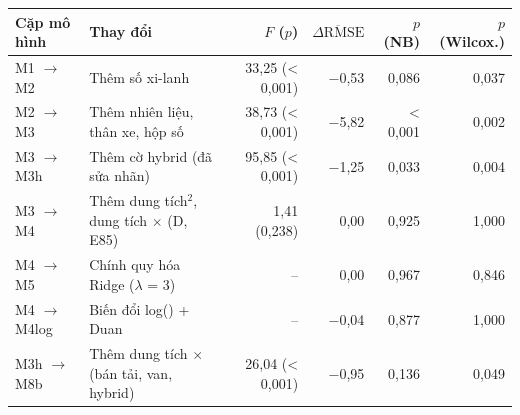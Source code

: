 \begin{tabular}{@{}l >{\raggedright\arraybackslash}p{4.3cm} r r r r@{}}
\toprule
Cặp mô hình & Thay đổi & $F$ ($p$) & $\overline{\Delta\text{RMSE}}$ & $p$ (NB) & $p$ (Wilcox.) \\
\midrule
M1 $\to$ M2 & Thêm số xi-lanh & 33,25 (< 0,001) & −0,53 & 0,086 & 0,037 \\
M2 $\to$ M3 & Thêm nhiên liệu, thân xe, hộp số & 38,73 (< 0,001) & −5,82 & < 0,001 & 0,002 \\
M3 $\to$ M3h & Thêm cờ hybrid (đã sửa nhãn) & 95,85 (< 0,001) & −1,25 & 0,033 & 0,004 \\
M3 $\to$ M4 & Thêm dung tích$^2$, dung tích $\times$ (D, E85) & 1,41 (0,238) & 0,00 & 0,925 & 1,000 \\
M4 $\to$ M5 & Chính quy hóa Ridge ($\lambda$ = 3) & -- & 0,00 & 0,967 & 0,846 \\
M4 $\to$ M4log & Biến đổi log(\COtwo{}) + Duan & -- & −0,04 & 0,877 & 1,000 \\
M3h $\to$ M8b & Thêm dung tích $\times$ (bán tải, van, hybrid) & 26,04 (< 0,001) & −0,95 & 0,136 & 0,049 \\
\bottomrule
\end{tabular}
